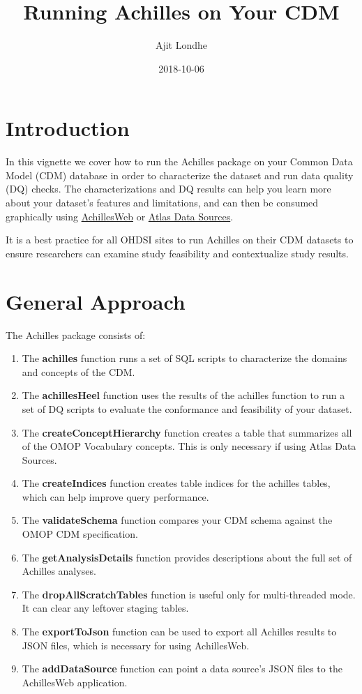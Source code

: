 \documentclass[]{article}
\title{Running Achilles on Your CDM}
\author{Ajit Londhe}
\date{2018-10-06}
\providecommand{\tightlist}{%
  \setlength{\itemsep}{0pt}\setlength{\parskip}{0pt}}
\begin{document}
\maketitle

{
\setcounter{tocdepth}{2}
\tableofcontents
}
\section{Introduction}\label{introduction}

In this vignette we cover how to run the Achilles package on your Common
Data Model (CDM) database in order to characterize the dataset and run
data quality (DQ) checks. The characterizations and DQ results can help
you learn more about your dataset's features and limitations, and can
then be consumed graphically using
\href{https://github.com/OHDSI/AchillesWeb}{AchillesWeb} or
\href{https://github.com/OHDSI/Atlas}{Atlas Data Sources}.

It is a best practice for all OHDSI sites to run Achilles on their CDM
datasets to ensure researchers can examine study feasibility and
contextualize study results.

\section{General Approach}\label{general-approach}

The Achilles package consists of:

\begin{enumerate}
\def\labelenumi{\arabic{enumi}.}
\tightlist
\item
  The \textbf{achilles} function runs a set of SQL scripts to
  characterize the domains and concepts of the CDM.
\item
  The \textbf{achillesHeel} function uses the results of the achilles
  function to run a set of DQ scripts to evaluate the conformance and
  feasibility of your dataset.
\item
  The \textbf{createConceptHierarchy} function creates a table that
  summarizes all of the OMOP Vocabulary concepts. This is only necessary
  if using Atlas Data Sources.
\item
  The \textbf{createIndices} function creates table indices for the
  achilles tables, which can help improve query performance.
\item
  The \textbf{validateSchema} function compares your CDM schema against
  the OMOP CDM specification.
\item
  The \textbf{getAnalysisDetails} function provides descriptions about
  the full set of Achilles analyses.
\item
  The \textbf{dropAllScratchTables} function is useful only for
  multi-threaded mode. It can clear any leftover staging tables.
\item
  The \textbf{exportToJson} function can be used to export all Achilles
  results to JSON files, which is necessary for using AchillesWeb.
\item
  The \textbf{addDataSource} function can point a data source's JSON
  files to the AchillesWeb application.
\end{enumerate}
\end{document}
